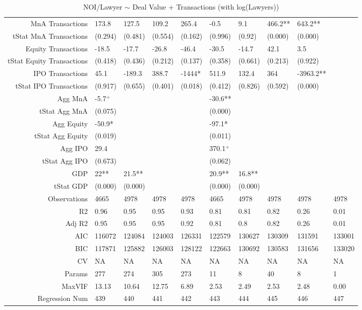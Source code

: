 \begin{table}[ht]
\begin{tabular}{rlllllllll}
  MnA Transactions & 173.8 & 127.5 & 109.2 & 265.4 & -0.5 & 9.1 & 466.2** & 643.2** &  \\ 
  tStat MnA Transactions & (0.294) & (0.481) & (0.554) & (0.162) & (0.996) & (0.92) & (0.000) & (0.000) &  \\ 
  Equity Transactions & -18.5 & -17.7 & -26.8 & -46.4 & -30.5 & -14.7 & 42.1 & 3.5 &  \\ 
  tStat Equity Transactions & (0.418) & (0.436) & (0.212) & (0.137) & (0.358) & (0.661) & (0.213) & (0.922) &  \\ 
  IPO Transactions & 45.1 & -189.3 & 388.7 & -1444* & 511.9 & 132.4 & 364 & -3963.2** &  \\ 
  tStat IPO Transactions & (0.917) & (0.655) & (0.401) & (0.018) & (0.412) & (0.826) & (0.592) & (0.000) &  \\ 
  Agg MnA & -5.7$^{+}$ &  &  &  & -30.6** &  &  &  &  \\ 
  tStat Agg MnA & (0.075) &  &  &  & (0.000) &  &  &  &  \\ 
  Agg Equity & -50.9* &  &  &  & -97.1* &  &  &  &  \\ 
  tStat Agg Equity & (0.019) &  &  &  & (0.011) &  &  &  &  \\ 
  Agg IPO & 29.4 &  &  &  & 370.1$^{+}$ &  &  &  &  \\ 
  tStat Agg IPO & (0.673) &  &  &  & (0.062) &  &  &  &  \\ 
  GDP & 22** & 21.5** &  &  & 20.9** & 16.8** &  &  &  \\ 
  tStat GDP & (0.000) & (0.000) &  &  & (0.000) & (0.000) &  &  &  \\ 
  Observations & 4665 & 4978 & 4978 & 4978 & 4665 & 4978 & 4978 & 4978 & 4978 \\ 
  R2 & 0.96 & 0.95 & 0.95 & 0.93 & 0.81 & 0.81 & 0.82 & 0.26 & 0.01 \\ 
  Adj R2 & 0.95 & 0.95 & 0.95 & 0.92 & 0.81 & 0.8 & 0.82 & 0.26 & 0.01 \\ 
  AIC & 116072 & 124084 & 124003 & 126331 & 122579 & 130627 & 130309 & 131591 & 133001 \\ 
  BIC & 117871 & 125882 & 126003 & 128122 & 122663 & 130692 & 130583 & 131656 & 133020 \\ 
  CV & NA & NA & NA & NA & NA & NA & NA & NA & NA \\ 
  Params & 277 & 274 & 305 & 273 & 11 & 8 & 40 & 8 & 1 \\ 
  MaxVIF & 13.13 & 10.64 & 12.75 & 6.89 & 2.53 & 2.49 & 2.53 & 2.48 & 0.00 \\ 
  Regression Num & 439 & 440 & 441 & 442 & 443 & 444 & 445 & 446 & 447 \\ 
   \hline
\end{tabular}
\caption{NOI/Lawyer $\sim$ Deal Value + Transactions (with log(Lawyers))} 
\end{table}
